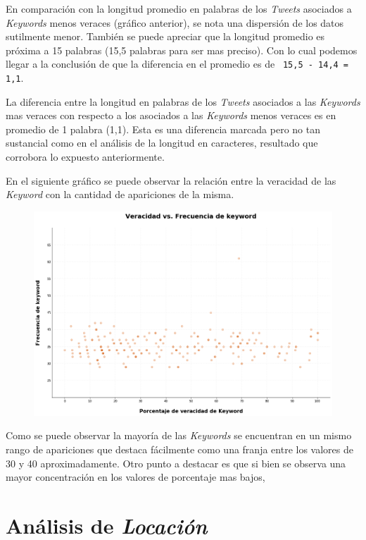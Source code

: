 \documentclass[titlepage,a4paper]{article}
\begin{document}
    En comparación con la longitud promedio en palabras de los \textit{Tweets} asociados a \textit{Keywords} menos veraces (gráfico anterior), se nota una dispersión de los datos sutilmente menor. También se puede apreciar que la longitud promedio es próxima a 15 palabras (15,5 palabras para ser mas preciso). Con lo cual podemos llegar a la conclusión de que la diferencia en el promedio es de \texttt{ 15,5 - 14,4 = 1,1}.
    
    La diferencia entre la longitud en palabras de los \textit{Tweets} asociados a las \textit{Keywords} mas veraces con respecto a los asociados a las \textit{Keywords} menos veraces es en promedio de 1 palabra (1,1). Esta es una diferencia marcada pero no tan sustancial como en el análisis de la longitud en caracteres, resultado que corrobora lo expuesto anteriormente.
    
    En el siguiente gráfico se puede observar la relación entre la veracidad de las \textit{Keyword} con la cantidad de apariciones de la misma.
    
    \begin{figure}[H]
    \centering
    \includegraphics[width=1\textwidth]{graficos/Analisis de Keyword/veracidad_vs_frec_de_keyword.png}
    \caption{} 
    \end{figure}
    
    Como se puede observar la mayoría de las \textit{Keywords} se encuentran en un mismo rango de apariciones que destaca fácilmente como una franja entre los valores de 30 y 40 aproximadamente. Otro punto a destacar es que si bien se observa una mayor concentración en los valores de porcentaje mas bajos, 
    
    \newpage
    \section{Análisis de \textit{Locación}}\label{sec:intro}
    
\end{document}
